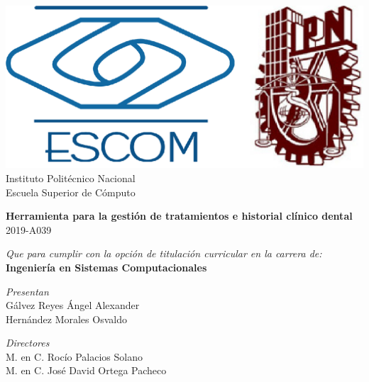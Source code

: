 \pagestyle{empty}


\begin{titlepage}

    \centering %

    \includegraphics[scale=0.17]{graphics/escom-ipn.png} %
    \LARGE{\\ Instituto Polit\'ecnico Nacional}
    \LARGE{\\ Escuela Superior de C\'omputo}
    
    \vspace{1cm} %

    \LARGE \textbf{Herramienta para la gestión de tratamientos e historial clínico dental}
    \LARGE {\\ 2019-A039}

    \vspace{1cm} %

    \LARGE \textit{Que para cumplir con la opción de titulación curricular en la carrera de:}
    \LARGE \textbf{\\ Ingeniería en Sistemas Computacionales}

    \vspace{1cm} %

   \textit{Presentan}\\
Gálvez Reyes Ángel Alexander\\
Hernández Morales Osvaldo 

    \vspace{1cm} %

   \textit{Directores}\\
   M. en C. Rocío Palacios Solano\\
   M. en C. José David Ortega Pacheco    

\end{titlepage}

\clearpage

									


